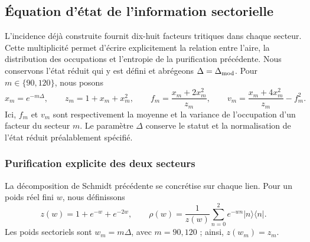 \subsection{Équation d'état de l'information sectorielle}
\label{v:ant:sec:ii-ecuacion-informacion}

L'incidence déjà construite fournit dix-huit facteurs tritiques dans
chaque secteur. Cette multiplicité permet d'écrire explicitement la
relation entre l'aire, la distribution des occupations et l'entropie de
la purification précédente. Nous conservons l'état réduit qui y est défini
et abrégeons $\Delta=\Delta_{\rm mod}$. Pour $m\in\{90,120\}$, nous posons
\begin{equation}
 x_m=e^{-m\Delta},\qquad z_m=1+x_m+x_m^2,\qquad
 f_m=\frac{x_m+2x_m^2}{z_m},\qquad
 v_m=\frac{x_m+4x_m^2}{z_m}-f_m^2.
 \label{v:ant:eq:ii-sector-momentos}
\end{equation}
Ici, $f_m$ et $v_m$ sont respectivement la moyenne et la variance de
l'occupation d'un facteur du secteur $m$. Le paramètre $\Delta$ conserve
le statut et la normalisation de l'état réduit préalablement
spécifié.

\subsubsection{Purification explicite des deux secteurs}
\label{v:ant:sec:ii-area-purificacion-producto}

La décomposition de Schmidt précédente se concrétise sur chaque lien.
Pour un poids réel fini \(w\), nous définissons
\[
 z(w)=1+e^{-w}+e^{-2w},\qquad
 \rho(w)=\frac1{z(w)}\sum_{n=0}^2e^{-wn}|n\rangle\langle n|.
\]
Les poids sectoriels sont \(w_m=m\Delta\), avec \(m=90,120\) ;
ainsi, \(z(w_m)=z_m\).

